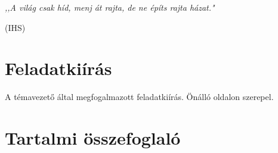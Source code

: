\documentclass[12pt]{report}
\theoremstyle{definition}
\begin{document}
    \onehalfspacing



    \clearpage
    \thispagestyle{empty}
    {
    \setlength\epigraphrule{0pt}
    \linespread{1.0}\epigraph{\small\emph{,,A világ csak híd, menj át rajta,
    de ne építs rajta házat."}}{\small(IHS)}
    }



    \tableofcontents




    \chapter*{Feladatkiírás}

A témavezető által megfogalmazott feladatkiírás. Önálló oldalon szerepel.



    \chapter*{Tartalmi összefoglaló}

\end{document}
